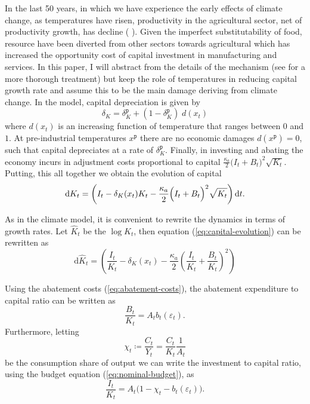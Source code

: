 \documentclass[../../main.tex]{subfiles}
\begin{document}
In the last 50 years, in which we have experience the early effects of climate change, as temperatures have risen, productivity in the agricultural sector, net of productivity growth, has decline (\citeauthor{dell_temperature_2012} \citeyear{dell_temperature_2012, dell_temperature_2009}). Given the imperfect substitutability of food, resource have been diverted from other sectors towards agricultural which has increased the opportunity cost of capital investment in manufacturing and services. In this paper, I will abstract from the details of the mechanism (see \cite{dietz_growth_2019} for a more thorough treatment) but keep the role of temperatures in reducing capital growth rate and assume this to be the main damage deriving from climate change. In the model, capital depreciation is given by \begin{equation}
    \delta_{K} = \delta^{\mathtt{p}}_{K} + (1 - \delta^{\mathtt{p}}_{K}) \; d(x_t)
\end{equation} where $d(x_t)$ is an increasing function of temperature that ranges between $0$ and $1$. At pre-industrial temperatures $x^{\mathtt{p}}$ there are no economic damages $d(x^{\mathtt{p}}) = 0$, such that capital depreciates at a rate of $\delta^{\mathtt{p}}_K$. Finally, in investing and abating the economy incurs in adjustment costs proportional to capital $\frac{\kappa_a}{2} \big(I_t + B_t \big)^2 \sqrt{K_t}$. Putting, this all together we obtain the evolution of capital \begin{equation} \label{eq:capital-evolution}
    \mathrm{d}K_t = \left( I_t - \delta_K(x_t) K_t - \frac{\kappa_a}{2} \Big(I_t + B_t\Big)^2 \sqrt{K_t} \right) \mathrm{d}t.
\end{equation} 

As in the climate model, it is convenient to rewrite the dynamics in terms of growth rates. Let $\hat K_t$ be the $\log K_t$, then equation (\ref{eq:capital-evolution}) can be rewritten as \begin{equation} \label{eq:capital-evolution:log:level}
    \text{d}\hat K_t = \left( \frac{I_t}{K_t} - \delta_K(x_t) - \frac{\kappa_a}{2} \left(\frac{I_t}{K_t} + \frac{B_t}{K_t}\right)^2 \right)
\end{equation}

Using the abatement costs (\ref{eq:abatement-costs}), the abatement expenditure to capital ratio can be written as \begin{equation}
    \frac{B_t}{K_t} = A_t b_t(\varepsilon_t).
\end{equation} Furthermore, letting \begin{equation}
    \chi_t \coloneqq \frac{C_t}{Y_t} = \frac{C_t}{K_t} \frac{1}{A_t}
\end{equation} be the consumption share of output we can write the investment to capital ratio, using the budget equation (\ref{eq:nominal-budget}), as \begin{equation}
    \frac{I_t}{K_t} = A_t \Big(1 - \chi_t - b_t(\varepsilon_t)\Big).
\end{equation}
\end{document}

